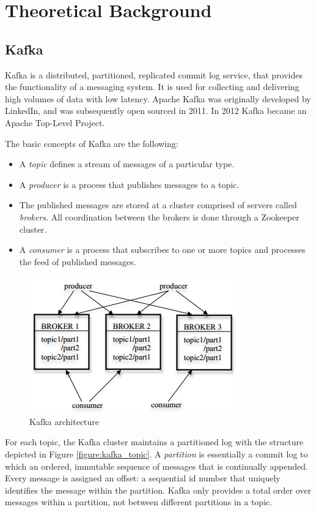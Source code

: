 \chapter{Theoretical Background}

\section{Kafka}

Kafka is a distributed, partitioned, replicated commit log service, that provides the functionality of a messaging system. It is used for collecting and delivering high volumes of data with low latency. Apache Kafka was originally developed by LinkedIn, and was subsequently open sourced in 2011. In 2012 Kafka became an Apache Top-Level Project.

The basic concepts of Kafka are the following:
\begin{itemize}
\item A \emph{topic} defines a stream of messages of a particular type.
\item A \emph{producer} is a process that publishes messages to a topic.
\item The published messages are stored at a cluster comprised of servers called \emph{brokers}. All coordination between the brokers is done through a Zookeeper cluster.
\item A \emph{consumer} is a process that subscribes to one or more topics and processes the feed of published messages.
\end{itemize}

\begin{figure}[H]
\centering
\includegraphics{figures/kafka_arch}
\caption{Kafka architecture}
\label{figure:kafka_arch}
\end{figure}

For each topic, the Kafka cluster maintains a partitioned log with the structure depicted in Figure \ref{figure:kafka_topic}. A \emph{partition} is essentially a commit log to which an ordered, immutable sequence of messages that is continually appended. Every message is assigned an offset: a sequential id number that uniquely identifies the message within the partition. Kafka only provides a total order over messages within a partition, not between different partitions in a topic.

